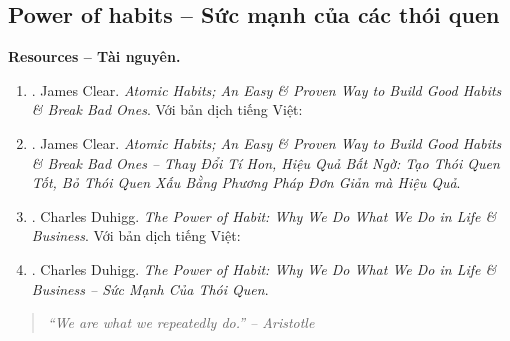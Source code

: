 \documentclass[12pt]{article}
\begin{document}
\subsection{Power of habits -- Sức mạnh của các thói quen}
\textbf{\textsf{Resources -- Tài nguyên.}}
\begin{enumerate}
	\item \cite{Clear_habit}. {\sc James Clear}. {\it Atomic Habits; An Easy \& Proven Way to Build Good Habits \& Break Bad Ones}. Với bản dịch tiếng Việt:
	\item \cite{Clear_habit_VN}. {\sc James Clear}. {\it Atomic Habits; An Easy \& Proven Way to Build Good Habits \& Break Bad Ones -- Thay Đổi Tí Hon, Hiệu Quả Bất Ngờ: Tạo Thói Quen Tốt, Bỏ Thói Quen Xấu Bằng Phương Pháp Đơn Giản mà Hiệu Quả}.
	\item \cite{Duhigg_habit}. {\sc Charles Duhigg}. {\it The Power of Habit: Why We Do What We Do in Life \& Business}. Với bản dịch tiếng Việt:
	\item \cite{Duhigg_habit_VN}. {\sc Charles Duhigg}. {\it The Power of Habit: Why We Do What We Do in Life \& Business -- Sức Mạnh Của Thói Quen}.
\end{enumerate}

\begin{quote}\it
	``We are what we repeatedly do.'' -- {\sc Aristotle}
\end{quote}
\end{document}
